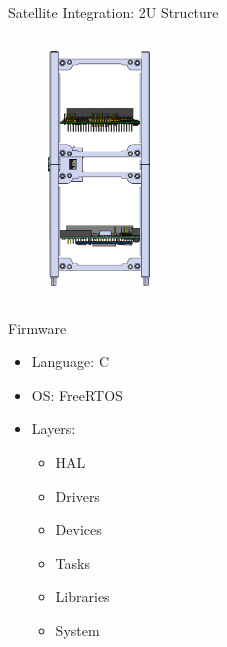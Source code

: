 \begin{frame}{Satellite Integration: 2U Structure}
\begin{columns}[t]
\begin{column}[t]{0.3\textwidth}
            \begin{figure}[!ht]
                \begin{center}
                    \includegraphics[width=2.7cm]{figures/slcam-ex3.png}
                \end{center}
            \end{figure}
        \end{column}
    \end{columns}

\end{frame}


\begin{frame}{Firmware}

    \begin{itemize}
        \item Language: C
        \vspace{0.3cm}
        \item OS: FreeRTOS
        \vspace{0.3cm}
        \item Layers:
            \begin{itemize}
                \item HAL
                \vspace{0.2cm}
                \item Drivers
                \vspace{0.2cm}
                \item Devices
                \vspace{0.2cm}
                \item Tasks
                \vspace{0.2cm}
                \item Libraries
                \vspace{0.2cm}
                \item System
            \end{itemize}
    \end{itemize}

\end{frame}

